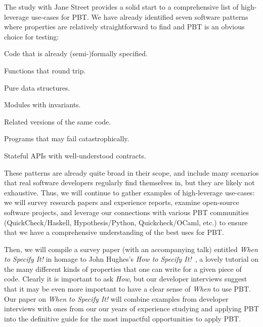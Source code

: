 The study with Jane Street provides a solid start to a comprehensive list of
high-leverage use-cases for PBT. We have already identified seven software
patterns where properties are relatively straightforward to find and PBT is an
obvious choice for testing:
\begin{enumerate*}%
\item Code that is already (semi-)formally specified.
\item Functions that round trip.
\item Pure data structures.
\item Modules with invariants.
\item Related versions of the same code.
\item Programs that may fail catastrophically.
\item Stateful APIs with well-understood contracts.
\end{enumerate*}
These patterns are already quite broad in their scope, and include many
scenarios that real software developers regularly find themselves in, but they
are likely not exhaustive. Thus, we will continue to gather examples of
high-leverage use-cases: we will survey research papers and experience reports,
examine open-source software projects, and leverage our connections with various
PBT communities (QuickCheck/Haskell, Hypothesis/Python, Quickcheck/OCaml, etc.)
to ensure that we have a comprehensive understanding of the best uses for PBT.

Then,
we will compile a survey paper
(with an accompanying talk)
entitled {\em When to Specify It!} in homage to
John Hughes's {\em How to Specify It!}~\cite{HowToSpecifyIt}, a lovely
tutorial on the many different kinds of properties that one can write
for a given piece
of code. Clearly it is important to ask {\em How}, but our developer interviews
suggest that it may be even more important to have a clear sense of {\em When}
to use PBT. Our paper on {\em When to Specify It!} will combine examples from developer
interviews with ones from our our years of experience studying and applying PBT
into the definitive guide for the most impactful opportunities to apply PBT.


 

